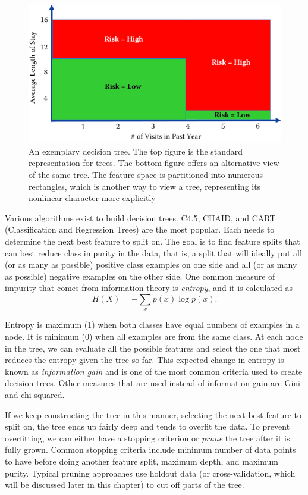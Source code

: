 \documentclass[]{krantz}
\begin{document}
\begin{figure}

{\centering \includegraphics[width=0.7\linewidth]{ChapterML/figures/tree-rectangle} 

}

\caption{An exemplary decision tree. The top figure is the standard representation for trees. The bottom figure offers an alternative view of the same tree. The feature space is partitioned into numerous rectangles, which is another way to view a tree, representing its nonlinear character more explicitly}\label{fig:tree}
\end{figure}

Various algorithms exist to build decision trees. C4.5, CHAID, and CART
(Classification and Regression Trees) are the most popular. Each needs
to determine the next best feature to split on. The goal is to find
feature splits that can best reduce class impurity in the data, that is,
a split that will ideally put all (or as many as possible) positive
class examples on one side and all (or as many as possible) negative
examples on the other side. One common measure of impurity that comes
from information theory is \emph{entropy}, and it is calculated as
\[H(X) = -\sum_x p(x) \log p(x).\]

Entropy is maximum (1) when both classes have equal numbers of examples
in a node. It is minimum (0) when all examples are from the same class.
At each node in the tree, we can evaluate all the possible features and
select the one that most reduces the entropy given the tree so far. This
expected change in entropy is known as \emph{information gain} and is
one of the most common criteria used to create decision trees. Other
measures that are used instead of information gain are Gini and
chi-squared.

If we keep constructing the tree in this manner, selecting the next best
feature to split on, the tree ends up fairly deep and tends to overfit
the data. To prevent overfitting, we can either have a stopping
criterion or \emph{prune} the tree after it is fully grown. Common
stopping criteria include minimum number of data points to have before
doing another feature split, maximum depth, and maximum purity. Typical
pruning approaches use holdout data (or cross-validation, which will be
discussed later in this chapter) to cut off parts of the tree.
\end{document}
